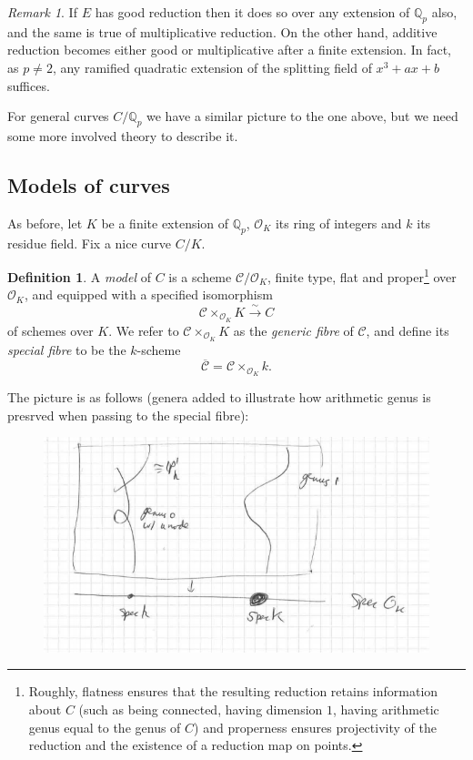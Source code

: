 \documentclass[12pt]{amsart}
\numberwithin{equation}{section}
\theoremstyle{remark}
\newtheorem{remark}[equation]{Remark}
\theoremstyle{definition}
\theoremstyle{definition}
\theoremstyle{definition}
\newtheorem{defi}[equation]{Definition}
\theoremstyle{definition}
\theoremstyle{definition}
\theoremstyle{definition}
\begin{document}
\begin{remark}
If $E$ has good reduction then it does so over any extension of $\mathbb{Q}_p$ also, and the same is true of multiplicative reduction. On the other hand, additive reduction becomes either good or multiplicative after a finite extension. In fact, as $p\neq 2$, any ramified quadratic extension of the splitting field of $x^3+ax+b$ suffices.
\end{remark}

For general curves $C/\mathbb{Q}_p$ we have a similar picture to the one above, but we need some more involved theory to describe it. 

\subsection{Models of curves}

As before, let $K$ be a finite extension of $\mathbb{Q}_p$, $\mathcal{O}_K$ its ring of integers and $k$ its residue field. Fix a nice curve $C/K$. 

\begin{defi}
A \textit{model} of $C$ is a scheme $\mathcal{C}/\mathcal{O}_K$, finite type, flat and proper\footnote{Roughly, flatness ensures that the resulting reduction retains information about $C$ (such as being connected, having dimension $1$, having arithmetic genus equal to the genus of $C$) and properness ensures projectivity of the reduction and the existence of a reduction map on points.} over $\mathcal{O}_K$, and equipped with a specified isomorphism \[\mathcal{C}\times_{\mathcal{O}_K}K\stackrel{\sim}{\longrightarrow} C\] of schemes over $K$. We refer to $\mathcal{C}\times_{\mathcal{O}_K}K$ as the \textit{generic fibre} of $\mathcal{C}$, and define its \textit{special fibre} to be the $k$-scheme
\[\overline{\mathcal{C}}=\mathcal{C}\times_{\mathcal{O}_K}k.\]
\end{defi} 

The picture is as follows (genera added to illustrate how arithmetic genus is presrved when passing to the special fibre):

\begin{figure} [!htb] 
\includegraphics[angle=0,scale=0.6]{model}
\end{figure}
\end{document}
